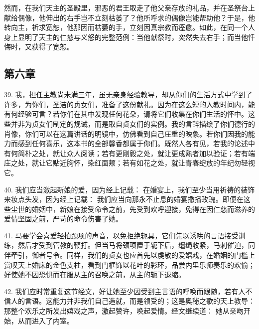 然而，在我们天主的圣殿里，邪恶的君王取走了他父亲存放的礼品，并在圣祭台上献给偶像，他伸出的右手岂不立刻枯萎了？他所呼求的偶像岂能帮助他？于是，他转向主，祈求宽恕，他那因而枯萎的手，立刻因真宗教而痊愈。如此，在同一个人身上显明了天主的仁慈与义怒的完整范例：当他献祭时，突然失去右手；而当他忏悔时，又获得了宽恕。\par


\subsection{第六章}

\par

39. 我，担任主教尚未满三年，虽无亲身经验教导，却从你们的生活方式中学到了许多，为你们，圣洁的贞女们，准备了这份献礼。因为在这么短的入教时间内，能有何经验可言？若你们在其中发现任何花朵，请将它们收集在你们生活的怀中。这些并非为贞女们制定的规诫，而是取自贞女们的实例。我的言辞描绘了你们德行的肖像，你们可以在这篇讲话的明镜中，仿佛看到自己庄重的映象。若你们因我的能力而感到任何喜乐，这本书的全部馨香都属于你们。既然人各有见，若我的论述中有何简朴之处，就让众人阅读；若有更刚毅之处，就让更成熟者加以验证；若有端庄之处，就让它贴近胸怀，染红面颊；若有如花之处，就让青春绽放的年纪勿轻视它。\par

40. 我们应当激起新娘的爱，因为经上记载： 在婚宴上，我们至少当用祈祷的装饰来妆点头发，因为经上记载： 我们应当向那永不止息的婚宴撒播玫瑰。即便在这些尘世的婚姻中，新娘在接受命令之前，先受到欢呼迎接，免得在因仁慈而滋养的爱情坚固之前，严苛的命令伤害了她。\par

41. 马要学会喜爱轻拍颈项的声音，以免拒绝轭具，它们先以诱哄的言语接受训练，然后才受到管教的鞭打。但当马将颈项置于轭下后，缰绳收紧，马刺催迫，同伴牵引，御者号令。同样，我们的贞女也应首先以虔敬的爱嬉戏，在婚姻的门槛上赏叹天上婚床的金色支柱，看到门框饰以花叶的彩环，品尝内里乐师奏乐的欢愉；好使她不因恐惧而在服从主的召唤之前，从主的轭下退缩。\par

42.  我们应时常重复这节经文，好让她至少因受到主言语的呼唤而跟随，若有人不信人的言语。这能力并非我们自己造就，而是领受的；这是奥秘之歌的天上教导： 那整个欢乐之所发出嬉戏之声，激起赞许，唤起爱情。经文继续道： 她从亲吻开始，从而进入了内室。\par

